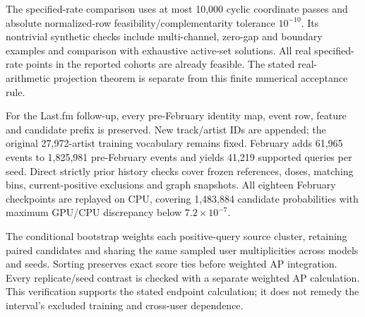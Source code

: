 \documentclass[pdflatex,sn-vancouver-num]{sn-jnl}
\theoremstyle{thmstyleone}
\begin{document}
\begin{appendices}
The specified-rate comparison uses at most 10,000 cyclic coordinate passes and absolute normalized-row feasibility/complementarity tolerance $10^{-10}$. Its nontrivial synthetic checks include multi-channel, zero-gap and boundary examples and comparison with exhaustive active-set solutions. All real specified-rate points in the reported cohorts are already feasible. The stated real-arithmetic projection theorem is separate from this finite numerical acceptance rule.

For the Last.fm follow-up, every pre-February identity map, event row, feature and candidate prefix is preserved. New track/artist IDs are appended; the original 27,972-artist training vocabulary remains fixed. February adds 61,965 events to 1,825,981 pre-February events and yields 41,219 supported queries per seed. Direct strictly prior history checks cover frozen references, doses, matching bins, current-positive exclusions and graph snapshots. All eighteen February checkpoints are replayed on CPU, covering 1,483,884 candidate probabilities with maximum GPU/CPU discrepancy below $7.2\times10^{-7}$.

The conditional bootstrap weights each positive-query source cluster, retaining paired candidates and sharing the same sampled user multiplicities across models and seeds. Sorting preserves exact score ties before weighted AP integration. Every replicate/seed contrast is checked with a separate weighted AP calculation. This verification supports the stated endpoint calculation; it does not remedy the interval's excluded training and cross-user dependence.
\end{appendices}
\end{document}
